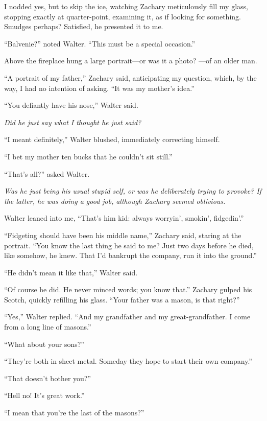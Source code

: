 I nodded yes, but to skip the ice, watching Zachary meticulously fill my
glass, stopping exactly at quarter-point, examining it, as if looking
for something. Smudges perhaps? Satisfied, he presented it to me.

``Balvenie?'' noted Walter. ``This must be a special occasion.''

Above the fireplace hung a large portrait---or was it a photo? ---of an
older man.

``A portrait of my father,'' Zachary said, anticipating my question,
which, by the way, I had no intention of asking. ``It was my mother's
idea.''

``You defiantly have his nose,'' Walter said.

\emph{Did he just say what I thought he just said?}

``I meant definitely,'' Walter blushed, immediately correcting himself.

``I bet my mother ten bucks that he couldn't sit still.''

``That's all?'' asked Walter.

\emph{Was he just being his usual stupid self, or was he deliberately
trying to provoke? If the latter, he was doing a good job,}
\emph{although Zachary seemed oblivious.}

Walter leaned into me, ``That's him kid: always worryin', smokin',
fidgedin'.''

``Fidgeting should have been his middle name,'' Zachary said, staring at
the portrait. ``You know the last thing he said to me? Just two days
before he died, like somehow, he knew. That I'd bankrupt the company,
run it into the ground.''

``He didn't mean it like that,'' Walter said.

``Of course he did. He never minced words; you know that.'' Zachary
gulped his Scotch, quickly refilling his glass. ``Your father was a
mason, is that right?''

``Yes,'' Walter replied. ``And my grandfather and my great-grand\-fa\-ther.
I come from a long line of masons.''

``What about your sons?''

``They're both in sheet metal. Someday they hope to start their own
company.''

``That doesn't bother you?''

``Hell no! It's great work.''

``I mean that you're the last of the masons?''

